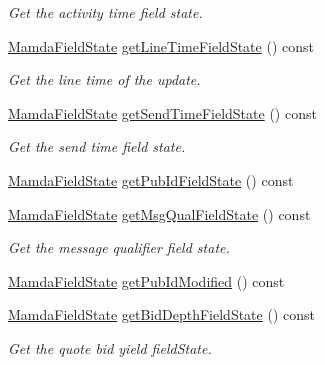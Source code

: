 \begin{CompactItemize}
\begin{CompactList}\small\item\em Get the activity time field state. \item\end{CompactList}\item 
\hyperlink{namespaceWombat_93aac974f2ab713554fd12a1fa3b7d2a}{Mamda\-Field\-State} \hyperlink{classWombat_1_1MamdaQuoteListener_35e889726482c3d6865c20adfd311e0b}{get\-Line\-Time\-Field\-State} () const 
\begin{CompactList}\small\item\em Get the line time of the update. \item\end{CompactList}\item 
\hyperlink{namespaceWombat_93aac974f2ab713554fd12a1fa3b7d2a}{Mamda\-Field\-State} \hyperlink{classWombat_1_1MamdaQuoteListener_751c64ca7bad56ffc99ca72e1494fb01}{get\-Send\-Time\-Field\-State} () const 
\begin{CompactList}\small\item\em Get the send time field state. \item\end{CompactList}\item 
\hyperlink{namespaceWombat_93aac974f2ab713554fd12a1fa3b7d2a}{Mamda\-Field\-State} \hyperlink{classWombat_1_1MamdaQuoteListener_5c9caa111b19d3141eb64767b3e82ba1}{get\-Pub\-Id\-Field\-State} () const 
\item 
\hyperlink{namespaceWombat_93aac974f2ab713554fd12a1fa3b7d2a}{Mamda\-Field\-State} \hyperlink{classWombat_1_1MamdaQuoteListener_84d03b5c192d75a4f5d6806028203c2e}{get\-Msg\-Qual\-Field\-State} () const 
\begin{CompactList}\small\item\em Get the message qualifier field state. \item\end{CompactList}\item 
\hyperlink{namespaceWombat_93aac974f2ab713554fd12a1fa3b7d2a}{Mamda\-Field\-State} \hyperlink{classWombat_1_1MamdaQuoteListener_98ff1dc2bd71e67918d73b21f76046bb}{get\-Pub\-Id\-Modified} () const 
\item 
\hyperlink{namespaceWombat_93aac974f2ab713554fd12a1fa3b7d2a}{Mamda\-Field\-State} \hyperlink{classWombat_1_1MamdaQuoteListener_98c0e8e6190f6cb27684fd9abcf4a356}{get\-Bid\-Depth\-Field\-State} () const 
\begin{CompactList}\small\item\em Get the quote bid yield field\-State. \item\end{CompactList}\item 

\end{CompactItemize}
